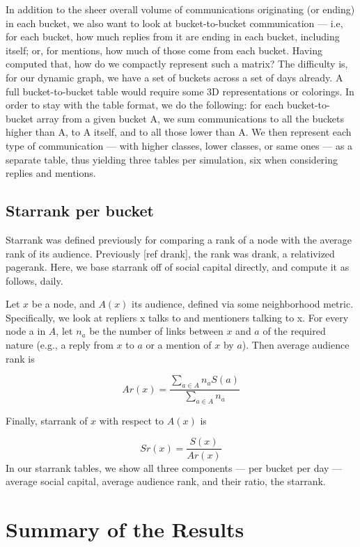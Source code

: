 \documentclass[10pt,oneside]{memoir}
\begin{document}
In addition to the sheer overall volume of communications originating (or ending) in each bucket, we also want to look at bucket-to-bucket communication --- i.e, for each bucket, how much replies from it are ending in each bucket, including itself; or, for mentions, how much of those come from each bucket.
Having computed that, how do we compactly represent such a matrix?  The difficulty is, for our dynamic graph, we have a set of buckets across a set of days already.  A full bucket-to-bucket table would require some 3D representations or colorings.  In order to stay with the table format, we do the following: for each bucket-to-bucket array from a given bucket A, we sum communications to all the buckets higher than A, to A itself, and to all those lower than A.  We then represent each type of communication --- with higher classes, lower classes, or same ones --- as a separate table, thus yielding three tables per simulation, six when considering replies and mentions.


\subsection{Starrank per bucket}
\label{starrankperbucket}

Starrank was defined previously for comparing a rank of a node with the average rank of its audience.  Previously [ref drank], the rank was drank, a relativized pagerank.  Here, we base starrank off of social capital directly, and compute it as follows, daily.



Let $x$ be a node, and $A(x)$ its audience, defined via some neighborhood metric.  Specifically, we look at repliers x talks to and mentioners talking to x.  For every node a in $A$, let $n_a$ be the number of links between $x$ and $a$ of the required nature (e.g., a reply from $x$ to $a$ or a mention of $x$ by $a$).  Then average audience rank is

\[ Ar(x) = \frac{\sum_{a \in A} n_a S(a)}{\sum_{a \in A} n_a} \]

Finally, starrank of $x$ with respect to $A(x)$ is

\[ Sr(x) = \frac{S(x)}{Ar(x)} \]
In our starrank tables, we show all three components --- per bucket per day --- average social capital, average audience rank, and their ratio, the starrank.


\section{Summary of the Results}
\label{summaryoftheresults}
\end{document}
